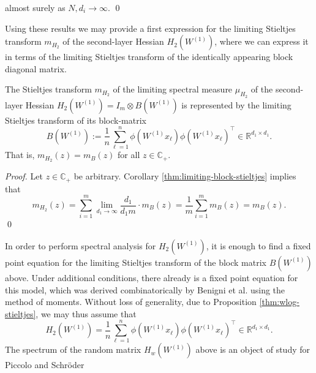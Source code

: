 \documentclass{article}
\begin{document}
almost surely as $N,d_i\to\infty$.
\qed
\bigskip
\par
Using these results we may provide a first expression for the limiting Stieltjes transform $m_{H_2}$ of the second-layer Hessian $H_2(W^{(1)})$, where we can express it in terms of the limiting Stieltjes transform of the identically appearing block diagonal matrix.
\bigskip
\\
\begin{proposition}\label{thm:wlog-stieltjes}
The Stieltjes transform $m_{H_2}$ of the limiting spectral measure $\mu_{H_2}$ of the second-layer Hessian $H_2(W^{(1)})=I_m\otimes B(W^{(1)})$ is represented by the limiting Stieltjes transform of its block-matrix $$B(W^{(1)}):=\frac{1}{n}\sum_{\ell=1}^n\phi(W^{(1)}x_\ell)\phi(W^{(1)}x_\ell)^\top\in\mathbb{R}^{d_1\times d_1}.$$
That is, $m_{H_2}(z)=m_B(z)$ for all $z\in\mathbb{C}_+$.
\end{proposition}
\bigskip
\noindent
\emph{Proof.} Let $z\in\mathbb{C}_+$ be arbitrary. Corollary \ref{thm:limiting-block-stieltjes} implies that
\begin{equation}
m_{H_2}(z)=\sum_{i=1}^m\lim_{d_1\to\infty}\frac{d_1}{d_1m}\cdot m_B(z)=\frac{1}{m}\sum_{i=1}^m m_B(z)=m_B(z).
\end{equation}
\qed
\bigskip
\par
In order to perform spectral analysis for $H_2(W^{(1)})$, it is enough to find a fixed point equation for the limiting Stieltjes transform of the block matrix $B(W^{(1)})$ above. Under additional conditions, there already is a fixed point equation for this model, which was derived combinatorically by Benigni et al. \cite{benigni} using the method of moments. Without loss of generality, due to Proposition \ref{thm:wlog-stieltjes}, we may thus assume that
\begin{equation}
H_2(W^{(1)})=\frac{1}{n}\sum_{\ell=1}^n\phi(W^{(1)}x_\ell)\phi(W^{(1)}x_\ell)^\top\in\mathbb{R}^{d_1\times d_1}.
\end{equation}
The spectrum of the random matrix $H_w(W^{(1)})$ above is an object of study for Piccolo and Schröder \cite{piccolo}
\bigskip
\\
\end{document}
